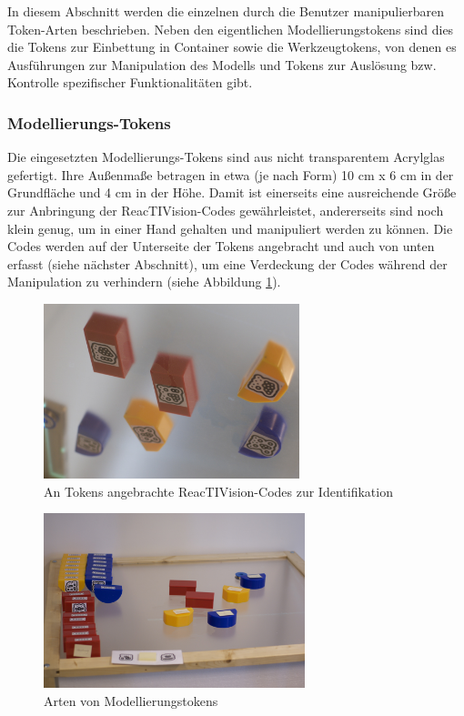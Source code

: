 In diesem Abschnitt werden die einzelnen durch die Benutzer manipulierbaren Token-Arten beschrieben. Neben den eigentlichen Modellierungstokens sind dies die Tokens zur Einbettung in Container sowie die Werkzeugtokens, von denen es Ausführungen zur Manipulation des Modells und Tokens zur Auslösung bzw. Kontrolle spezifischer Funktionalitäten gibt.

\subsubsection{Modellierungs-Tokens} %
\label{subs:modellierungs_tokens}

Die eingesetzten Modellierungs-Tokens sind aus nicht transparentem Acrylglas gefertigt. Ihre Außenmaße betragen in etwa (je nach Form) 10 cm x 6 cm in der Grundfläche und 4 cm in der Höhe. Damit ist einerseits eine ausreichende Größe zur Anbringung der ReacTIVision-Codes gewährleistet, andererseits sind noch klein genug, um in einer Hand gehalten und manipuliert werden zu können. Die Codes werden auf der Unterseite der Tokens angebracht und auch von unten erfasst (siehe nächster Abschnitt), um eine Verdeckung der Codes während der Manipulation zu verhindern (siehe Abbildung \ref{fig:img_ImplementierungInput_TokensCodes}).

\begin{figure}[htbp]
	\centering
		\includegraphics[height=2in]{img/ImplementierungInput/TokensCodes.jpg}
	\caption{An Tokens angebrachte ReacTIVision-Codes zur Identifikation}
	\label{fig:img_ImplementierungInput_TokensCodes}
\end{figure}

\begin{figure}[htbp]
	\centering
		\includegraphics[height=2in]{img/ImplementierungInput/TokenTypes.jpg}
	\caption{Arten von Modellierungstokens}
	\label{fig:img_ImplementierungInput_TokenTypes}
\end{figure}


